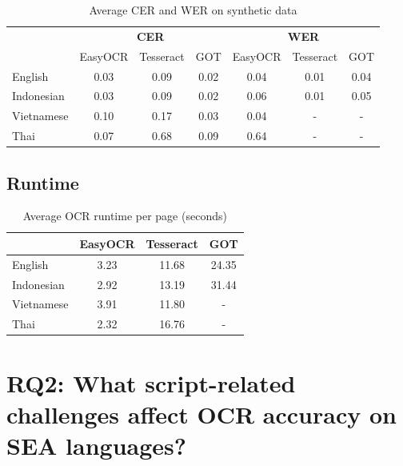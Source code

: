 \documentclass[12pt,oneside]{memoir}
\begin{document}
\begin{table}[ht]
    \centering
    \caption{Average CER and WER on synthetic data}
    \label{table:ocr-accuracy-on-synthetic-data}
    \begin{tabular}{lcccccc}
        \toprule
        & \multicolumn{3}{c}{\textbf{CER}} & \multicolumn{3}{c}{\textbf{WER}}\\
        \cmidrule(lr){2-4}\cmidrule(lr){5-7}
        & EasyOCR & Tesseract & GOT & EasyOCR & Tesseract & GOT\\
        \midrule
        English & 0.03 & 0.09 & 0.02 & 0.04 & 0.01 & 0.04\\
        \midrule
        Indonesian & 0.03 & 0.09 & 0.02 & 0.06 & 0.01 & 0.05\\
        Vietnamese & 0.10 & 0.17 & 0.03 & 0.04 & - & -\\
        Thai & 0.07 & 0.68 & 0.09 & 0.64 & - & -\\
        \bottomrule
    \end{tabular}
\end{table}

\subsection{Runtime}

\begin{table}[ht]
    \caption{Average OCR runtime per page (seconds)}
    \label{table:runtime}
    \centering
    \begin{tabular}{lccc}
        \toprule
        & EasyOCR & Tesseract & GOT\\ 
        \midrule
        English & 3.23 & 11.68 & 24.35\\
        Indonesian & 2.92 & 13.19 & 31.44\\
        Vietnamese & 3.91 & 11.80 & -\\
        Thai & 2.32 & 16.76 & -\\
        \bottomrule
    \end{tabular}
\end{table}

\section{RQ2: What script-related challenges affect OCR accuracy on SEA languages?}
\end{document}
